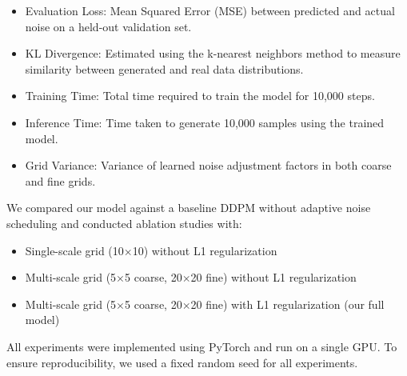 \documentclass{article} %
\begin{document}
\begin{itemize}
    \item Evaluation Loss: Mean Squared Error (MSE) between predicted and actual noise on a held-out validation set.
    \item KL Divergence: Estimated using the k-nearest neighbors method to measure similarity between generated and real data distributions.
    \item Training Time: Total time required to train the model for 10,000 steps.
    \item Inference Time: Time taken to generate 10,000 samples using the trained model.
    \item Grid Variance: Variance of learned noise adjustment factors in both coarse and fine grids.
\end{itemize}

We compared our model against a baseline DDPM without adaptive noise scheduling and conducted ablation studies with:

\begin{itemize}
    \item Single-scale grid (10$\times$10) without L1 regularization
    \item Multi-scale grid (5$\times$5 coarse, 20$\times$20 fine) without L1 regularization
    \item Multi-scale grid (5$\times$5 coarse, 20$\times$20 fine) with L1 regularization (our full model)
\end{itemize}

All experiments were implemented using PyTorch and run on a single GPU. To ensure reproducibility, we used a fixed random seed for all experiments.
\end{document}
